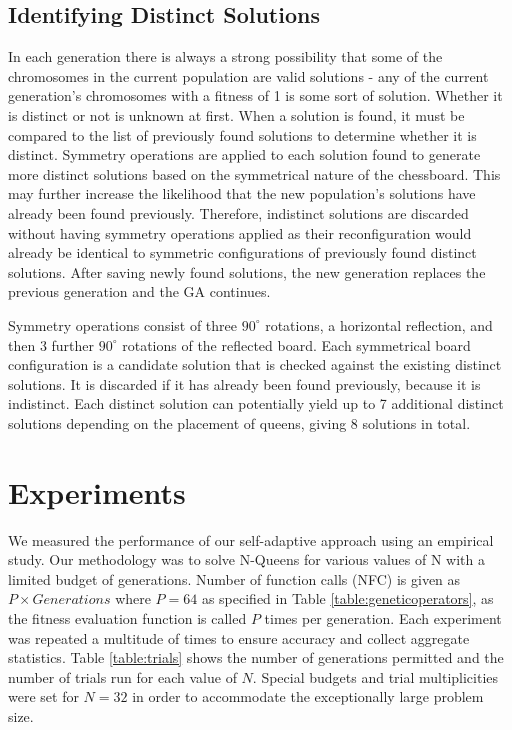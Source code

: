 \documentclass[conference]{IEEEtran}
\begin{document}
\subsection{Identifying Distinct Solutions}
In each generation there is always a strong possibility that some of the chromosomes in the current population are valid solutions - any of the current generation's chromosomes with a fitness of 1 is some sort of solution. Whether it is distinct or not is unknown at first. When a solution is found, it must be compared to the list of previously found solutions to determine whether it is distinct. Symmetry operations are applied to each solution found to generate more distinct solutions based on the symmetrical nature of the chessboard. This may further increase the likelihood that the new population's solutions have already been found previously. Therefore, indistinct solutions are discarded without having symmetry operations applied as their reconfiguration would already be identical to symmetric configurations of previously found distinct solutions. After saving newly found solutions, the new generation replaces the previous generation and the GA continues.

Symmetry operations consist of three $90^{\circ}$ rotations, a horizontal reflection, and then 3 further $90^{\circ}$ rotations of the reflected board. Each symmetrical board configuration is a candidate solution that is checked against the existing distinct solutions. It is discarded if it has already been found previously, because it is indistinct. Each distinct solution can potentially yield up to 7 additional distinct solutions depending on the placement of queens, giving 8 solutions in total.

\section{Experiments}
We measured the performance of our self-adaptive approach using an empirical study. Our methodology was to solve N-Queens for various values of N with a limited budget of generations. Number of function calls (NFC) is given as $P \times Generations$ where $P = 64$ as specified in Table \ref{table:geneticoperators}, as the fitness evaluation function is called $P$ times per generation. Each experiment was repeated a multitude of times to ensure accuracy and collect aggregate statistics. Table \ref{table:trials} shows the number of generations permitted and the number of trials run for each value of $N$. Special budgets and trial multiplicities were set for $N = 32$ in order to accommodate the exceptionally large problem size.
\end{document}
